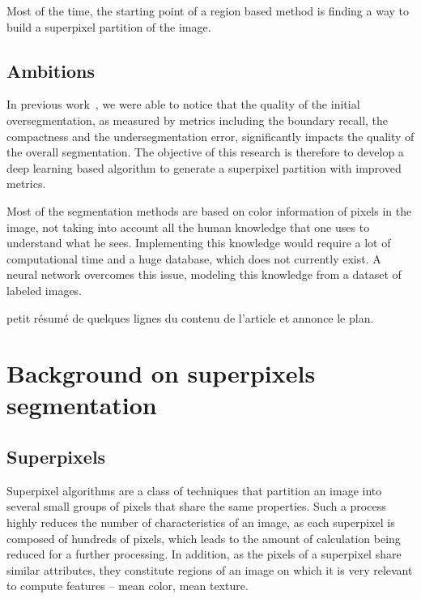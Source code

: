 \documentclass{article}
\begin{document}
        Most of the time, the starting point of a region based method is finding a way to build a superpixel partition of the image.

    \subsection{Ambitions}
        In previous work~\cite{chang2019}, we were able to notice that the quality of the initial oversegmentation, as measured by metrics including the boundary recall, the compactness and the undersegmentation error, significantly impacts the quality of the overall segmentation. The objective of this research is therefore to develop a deep learning based algorithm to generate a superpixel partition with improved metrics.
        \par
        Most of the segmentation methods are based on color information of pixels in the image, not taking into account all the human knowledge that one uses to understand what he sees. Implementing this knowledge would require a lot of computational time and a huge database, which does not currently exist. A neural network overcomes this issue, modeling this knowledge from a dataset of labeled images.
        \par
        \cite{todo} petit résumé de quelques lignes du contenu de l’article et annonce le plan.

\newpage
\section{Background on superpixels segmentation}

    \subsection{Superpixels}
        Superpixel algorithms are a class of techniques that partition an image into several small groups of pixels that share the same properties. Such a process highly reduces the number of characteristics of an image, as each superpixel is composed of hundreds of pixels, which leads to the amount of calculation being reduced for a further processing. In addition, as the pixels of a superpixel share similar attributes, they constitute regions of an image on which it is very relevant to compute features -- mean color, mean texture.
\end{document}
